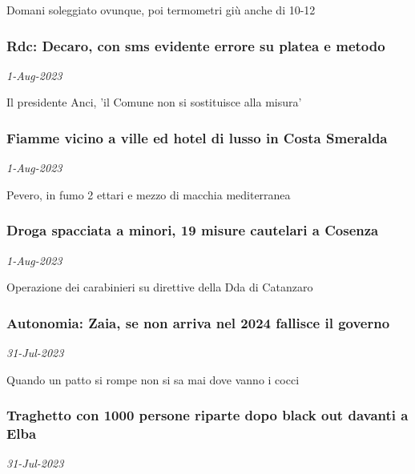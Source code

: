 Domani soleggiato ovunque, poi termometri gi\`{u} anche di 10-12\angC
\subsubsection{Rdc: Decaro, con sms evidente errore su platea e metodo \href{https://www.ansa.it/sito/notizie/cronaca/2023/08/01/rdc-decaro-con-sms-evidente-errore-su-platea-e-metodo_befb7c66-6862-44c1-9f4c-67e4ffc95fea.html}{}}
\textit{1-Aug-2023}

Il presidente Anci, 'il Comune non si sostituisce alla misura'
\subsubsection{Fiamme vicino a ville ed hotel di lusso in Costa Smeralda \href{https://www.ansa.it/sito/notizie/cronaca/2023/08/01/fiamme-vicino-a-ville-ed-hotel-di-lusso-in-costa-smeralda_530b9003-98bd-42c2-8951-9b12041ae86b.html}{}}
\textit{1-Aug-2023}

Pevero, in fumo 2 ettari e mezzo di macchia mediterranea
\subsubsection{Droga spacciata a minori, 19 misure cautelari a Cosenza \href{https://www.ansa.it/sito/notizie/cronaca/2023/08/01/droga-spacciata-a-minori-19-misure-cautelari-a-cosenza_9e75c4fb-18d6-417f-8e0b-9abab2c8ad73.html}{}}
\textit{1-Aug-2023}

Operazione dei carabinieri su direttive della Dda di Catanzaro
\subsubsection{Autonomia: Zaia, se non arriva nel 2024 fallisce il governo \href{https://www.ansa.it/sito/notizie/cronaca/2023/07/31/autonomia-zaia-se-non-arriva-nel-2024-fallisce-il-governo_4f6b5298-b94d-43e8-ae3d-3b90418185e2.html}{}}
\textit{31-Jul-2023}

Quando un patto si rompe non si sa mai dove vanno i cocci
\subsubsection{Traghetto con 1000 persone riparte dopo black out davanti a Elba \href{https://www.ansa.it/sito/notizie/cronaca/2023/07/31/traghetto-con-1000-persone-riparte-dopo-black-out-davanti-a-elba_1b0f60c4-955c-46e6-9d3a-3e6f6d00b00d.html}{}}
\textit{31-Jul-2023}

